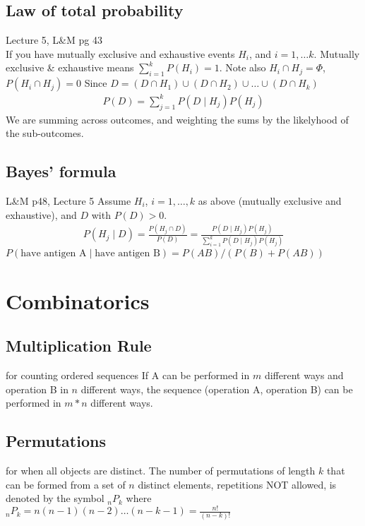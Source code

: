  \subsection{Law of total probability} {\tiny Lecture 5, L\&M pg 43}   \hfill \\
 If you have mutually exclusive and exhaustive events $H_i$, and $i = 1, \dots k$.  Mutually exclusive \& exhaustive means $\sum_{i=1}^k P(H_i) = 1$.  Note also $H_i \cap H_j = \Phi$, $P(H_i \cap H_j) = 0$  
 Since $D = (D \cap H_1) \cup (D \cap H_2) \cup \dots \cup  (D \cap H_k)$
	\begin{align*}
 		P(D) = \sum_{j=1}^k P(D \mid H_j) P(H_j) 
  	\end{align*}
We are summing across outcomes, and weighting the sums by the likelyhood of the sub-outcomes.
 
 \subsection{Bayes' formula} {\tiny L\&M p48, Lecture 5}
 Assume $H_i$, $i = 1, \dots, k$ as above (mutually exclusive and exhaustive), and $D$ with $P(D) > 0$.
 	\begin{align*}
		P(H_j \mid D) = \frac{P(H_j \cap D)}{P(D)} = \frac{P(D \mid H_j) P(H_j) }{\sum_{i=1}^k P(D \mid H_j) P(H_j) }
	\end{align*}
$P(\mbox{have antigen A} \mid \mbox{have antigen B}) = P(AB)/(P(B) + P(AB)) $
	

\section{Combinatorics}

\subsection{Multiplication Rule} for counting ordered sequences
If A can be performed in $m$ different ways and operation B in $n$ different ways, the sequence (operation A, operation B) can be performed in $m*n$ different ways. 

\subsection{Permutations} for when all objects are distinct.
The number of permutations of length $k$ that can be formed from a set of $n$ distinct elements, repetitions NOT allowed, is denoted by the symbol ${_n}P_k$ where ${_n}P_k = n(n-1)(n-2) \dots (n - k - 1) = \frac{n!}{(n-k)!}$ 


